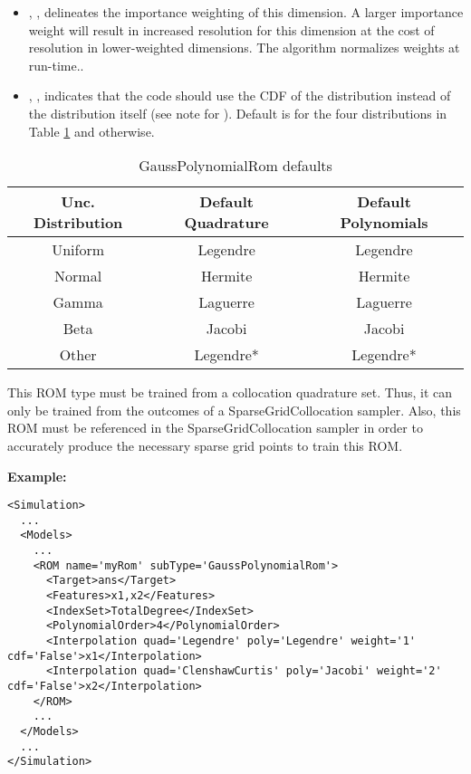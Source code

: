 \begin{itemize}
\begin{itemize}
      \ref{tab:gpcCompatible}.  Currently, no polynomials are available outside the
      default. 
    \item  {}, , 
      delineates the importance weighting of this dimension.  A larger importance weight will
      result in increased resolution for this dimension at the cost of resolution in lower-weighted
      dimensions.  The algorithm normalizes weights at run-time..
    \item {}, ,
      indicates that the code should use the CDF of the distribution instead of the distribution
      itself (see note for ).  Default is  for the four distributions
      in Table \ref{tab:gpcCompatible} and  otherwise.
  \end{itemize}
\end{itemize}
\begin{table}[htb]
  \centering
  \begin{tabular}{c | c c}
    Unc. Distribution & Default Quadrature & Default Polynomials \\ \hline
    Uniform & Legendre & Legendre \\
    Normal & Hermite & Hermite \\ \hline
    Gamma & Laguerre & Laguerre \\
    Beta & Jacobi & Jacobi \\ \hline
    Other & Legendre* & Legendre*
  \end{tabular}
  \caption{GaussPolynomialRom defaults}
  \label{tab:gpcCompatible}
\end{table}
%
\nb This ROM type must be trained from a collocation quadrature set.
%
Thus, it can only be trained from the outcomes of a SparseGridCollocation sampler.
Also, this ROM must be referenced in the SparseGridCollocation sampler in order to
accurately produce the necessary sparse grid points to train this ROM.

\textbf{Example:}
\begin{lstlisting}[style=XML,morekeywords={name,subType}]
<Simulation>
  ...
  <Models>
    ...
    <ROM name='myRom' subType='GaussPolynomialRom'>
      <Target>ans</Target>
      <Features>x1,x2</Features>
      <IndexSet>TotalDegree</IndexSet>
      <PolynomialOrder>4</PolynomialOrder>
      <Interpolation quad='Legendre' poly='Legendre' weight='1' cdf='False'>x1</Interpolation>
      <Interpolation quad='ClenshawCurtis' poly='Jacobi' weight='2' cdf='False'>x2</Interpolation>
    </ROM>
    ...
  </Models>
  ...
</Simulation>
\end{lstlisting}


